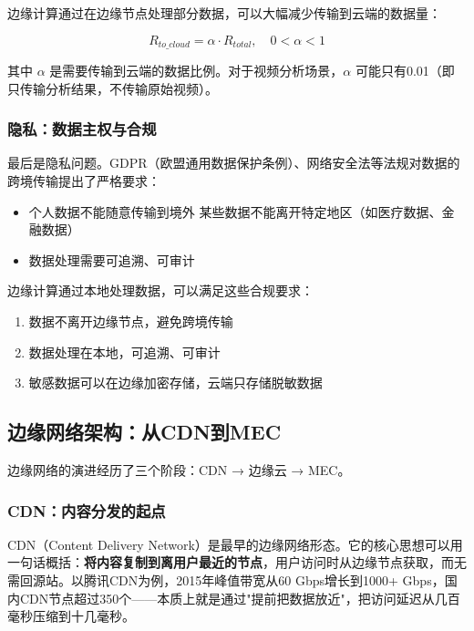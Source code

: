 边缘计算通过在边缘节点处理部分数据，可以大幅减少传输到云端的数据量：

\begin{equation}
R_{to\_cloud} = \alpha \cdot R_{total}, \quad 0 < \alpha < 1
\end{equation}

其中 $\alpha$ 是需要传输到云端的数据比例。对于视频分析场景，$\alpha$ 可能只有0.01（即只传输分析结果，不传输原始视频）。

\subsubsection{隐私：数据主权与合规}

最后是隐私问题。GDPR（欧盟通用数据保护条例）、网络安全法等法规对数据的跨境传输提出了严格要求：

\begin{itemize}
    \item 个人数据不能随意传输到境外
    \in 某些数据不能离开特定地区（如医疗数据、金融数据）
    \item 数据处理需要可追溯、可审计
\end{itemize}

边缘计算通过本地处理数据，可以满足这些合规要求：
\begin{enumerate}
    \item 数据不离开边缘节点，避免跨境传输
    \item 数据处理在本地，可追溯、可审计
    \item 敏感数据可以在边缘加密存储，云端只存储脱敏数据
\end{enumerate}

\subsection{边缘网络架构：从CDN到MEC}

边缘网络的演进经历了三个阶段：CDN → 边缘云 → MEC。

\subsubsection{CDN：内容分发的起点}

CDN（Content Delivery Network）是最早的边缘网络形态。它的核心思想可以用一句话概括：\textbf{将内容复制到离用户最近的节点}，用户访问时从边缘节点获取，而无需回源站。以腾讯CDN为例，2015年峰值带宽从60 Gbps增长到1000+ Gbps，国内CDN节点超过350个——本质上就是通过"提前把数据放近"，把访问延迟从几百毫秒压缩到十几毫秒。

